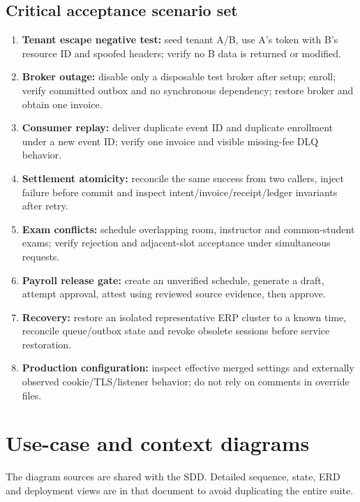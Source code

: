 \documentclass[10pt,a4paper]{article}
\begin{document}
\subsection{Critical acceptance scenario set}
\begin{enumerate}[label=AT-\arabic*]
\item \textbf{Tenant escape negative test:} seed tenant A/B, use A's token with B's resource
ID and spoofed headers; verify no B data is returned or modified.
\item \textbf{Broker outage:} disable only a disposable test broker after setup; enroll;
verify committed outbox and no synchronous dependency; restore broker and obtain one invoice.
\item \textbf{Consumer replay:} deliver duplicate event ID and duplicate enrollment under
a new event ID; verify one invoice and visible missing-fee DLQ behavior.
\item \textbf{Settlement atomicity:} reconcile the same success from two callers, inject
failure before commit and inspect intent/invoice/receipt/ledger invariants after retry.
\item \textbf{Exam conflicts:} schedule overlapping room, instructor and common-student
exams; verify rejection and adjacent-slot acceptance under simultaneous requests.
\item \textbf{Payroll release gate:} create an unverified schedule, generate a draft,
attempt approval, attest using reviewed source evidence, then approve.
\item \textbf{Recovery:} restore an isolated representative ERP cluster to a known time,
reconcile queue/outbox state and revoke obsolete sessions before service restoration.
\item \textbf{Production configuration:} inspect effective merged settings and externally
observed cookie/TLS/listener behavior; do not rely on comments in override files.
\end{enumerate}

\clearpage
\section{Use-case and context diagrams}
The diagram sources are shared with the SDD. Detailed sequence, state, ERD and
deployment views are in that document to avoid duplicating the entire suite.
\end{document}
